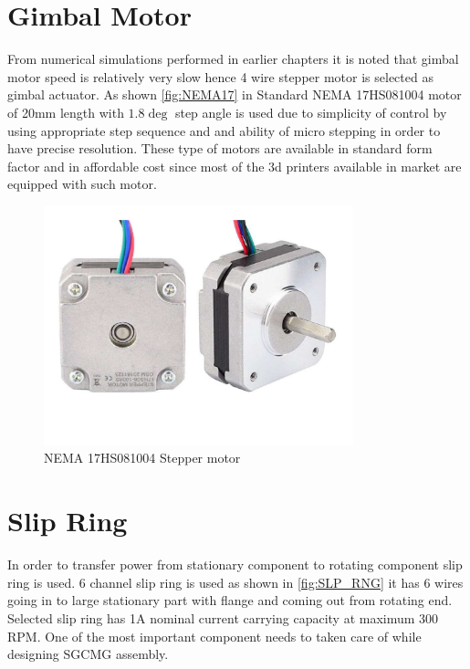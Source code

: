 \section{Gimbal Motor}
From numerical simulations performed in earlier chapters it is noted that gimbal motor speed is relatively very slow hence 4 wire stepper motor is selected as gimbal actuator. As shown \autoref{fig:NEMA17} in Standard NEMA 17HS081004 motor of 20mm length with $1.8 \deg$ step angle \cite{web:ds_nema17} is used due to simplicity of control by using appropriate step sequence and and ability of micro stepping in order to have precise resolution. These type of motors are available in standard form factor and in affordable cost since most of the 3d printers available in market are equipped with such motor. 
\begin{figure}[ht]
    \centering
    \includegraphics[width=0.80\textwidth]{figures/Assembly/NEMA17.pdf}
    \caption{NEMA 17HS081004 Stepper motor \cite{web:ds_nema17}}
    \label{fig:NEMA17}
\end{figure}
\section{Slip Ring}
In order to transfer power from stationary component to rotating component slip ring is used. 6 channel slip ring is used as shown in \autoref{fig:SLP_RNG} it has 6 wires going in to large stationary part with flange and coming out from rotating end. Selected slip ring has 1A nominal current carrying capacity at maximum 300 RPM. One of the most important component needs to taken care of while designing SGCMG assembly.

